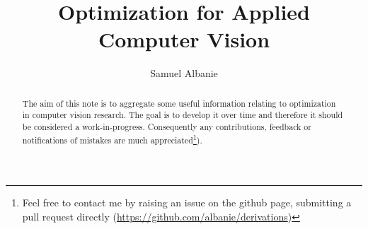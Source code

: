 \documentclass[11pt,openany]{memoir}
\title{Optimization for Applied Computer Vision}
\author{
Samuel Albanie
}
\date{}
\begin{document}


\frontmatter
\maketitle{}

\begin{abstract}
The aim of this note is to aggregate some useful information relating to optimization in computer vision research.
The goal is to develop it over time and therefore it should be considered a work-in-progress.  Consequently any contributions, feedback or notifications of mistakes are much appreciated\footnote{Feel free to contact me by raising an issue on the github page, submitting a pull request directly (\mbox{\url{https://github.com/albanie/derivations})}}).
\end{abstract}
\clearpage

\tableofcontents*
\clearpage

\mainmatter






\end{document}
